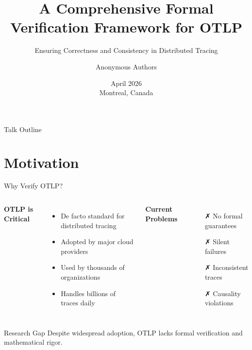 \documentclass[aspectratio=169,xcolor=dvipsnames]{beamer}
\title{A Comprehensive Formal Verification Framework for OTLP}
\subtitle{Ensuring Correctness and Consistency in Distributed Tracing}
\author{Anonymous Authors}
\institute{ICSE 2026}
\date{April 2026 \\ Montreal, Canada}
\begin{document}
\begin{frame}
\titlepage
\end{frame}

\begin{frame}{Talk Outline}
\tableofcontents
\end{frame}

\section{Motivation}

\begin{frame}{Why Verify OTLP?}
\begin{columns}[T]
\textbf{OTLP is Critical}
\begin{itemize}
    \item De facto standard for distributed tracing
    \item Adopted by major cloud providers
    \item Used by thousands of organizations
    \item Handles billions of traces daily
\end{itemize}

\textbf{Current Problems}
\begin{itemize}
    \item[\color{red}✗] No formal guarantees
    \item[\color{red}✗] Silent failures
    \item[\color{red}✗] Inconsistent traces
    \item[\color{red}✗] Causality violations
\end{itemize}
\end{columns}

\vspace{1em}
\begin{alertblock}{Research Gap}
Despite widespread adoption, OTLP lacks formal verification and mathematical rigor.
\end{alertblock}
\end{frame}
\end{document}
